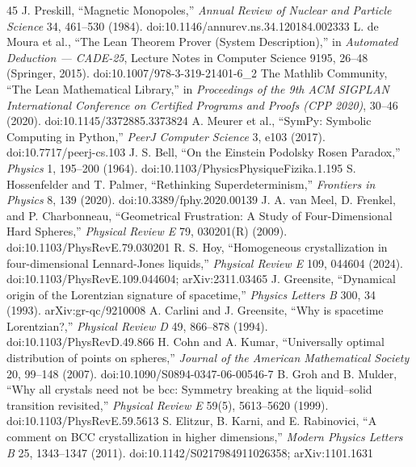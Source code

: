 \documentclass[11pt,a4paper]{article}
\begin{document}
\begin{thebibliography}{45}
 J. Preskill, ``Magnetic Monopoles,'' \emph{Annual Review of Nuclear and Particle Science} 34, 461--530 (1984). doi:10.1146/annurev.ns.34.120184.002333
 L. de Moura et al., ``The Lean Theorem Prover (System Description),'' in \emph{Automated Deduction --- CADE-25}, Lecture Notes in Computer Science 9195, 26--48 (Springer, 2015). doi:10.1007/978-3-319-21401-6\_2
 The Mathlib Community, ``The Lean Mathematical Library,'' in \emph{Proceedings of the 9th ACM SIGPLAN International Conference on Certified Programs and Proofs (CPP 2020)}, 30--46 (2020). doi:10.1145/3372885.3373824
 A. Meurer et al., ``SymPy: Symbolic Computing in Python,'' \emph{PeerJ Computer Science} 3, e103 (2017). doi:10.7717/peerj-cs.103
 J. S. Bell, ``On the Einstein Podolsky Rosen Paradox,'' \emph{Physics} 1, 195--200 (1964). doi:10.1103/PhysicsPhysiqueFizika.1.195
 S. Hossenfelder and T. Palmer, ``Rethinking Superdeterminism,'' \emph{Frontiers in Physics} 8, 139 (2020). doi:10.3389/fphy.2020.00139
 J. A. van Meel, D. Frenkel, and P. Charbonneau, ``Geometrical Frustration: A Study of Four-Dimensional Hard Spheres,'' \emph{Physical Review E} 79, 030201(R) (2009). doi:10.1103/PhysRevE.79.030201
 R. S. Hoy, ``Homogeneous crystallization in four-dimensional Lennard-Jones liquids,'' \emph{Physical Review E} 109, 044604 (2024). doi:10.1103/PhysRevE.109.044604; arXiv:2311.03465
 J. Greensite, ``Dynamical origin of the Lorentzian signature of spacetime,'' \emph{Physics Letters B} 300, 34 (1993). arXiv:gr-qc/9210008
 A. Carlini and J. Greensite, ``Why is spacetime Lorentzian?,'' \emph{Physical Review D} 49, 866--878 (1994). doi:10.1103/PhysRevD.49.866
 H. Cohn and A. Kumar, ``Universally optimal distribution of points on spheres,'' \emph{Journal of the American Mathematical Society} 20, 99--148 (2007). doi:10.1090/S0894-0347-06-00546-7
 B. Groh and B. Mulder, ``Why all crystals need not be bcc: Symmetry breaking at the liquid--solid transition revisited,'' \emph{Physical Review E} 59(5), 5613--5620 (1999). doi:10.1103/PhysRevE.59.5613
 S. Elitzur, B. Karni, and E. Rabinovici, ``A comment on BCC crystallization in higher dimensions,'' \emph{Modern Physics Letters B} 25, 1343--1347 (2011). doi:10.1142/S0217984911026358; arXiv:1101.1631
\end{thebibliography}
\end{document}
